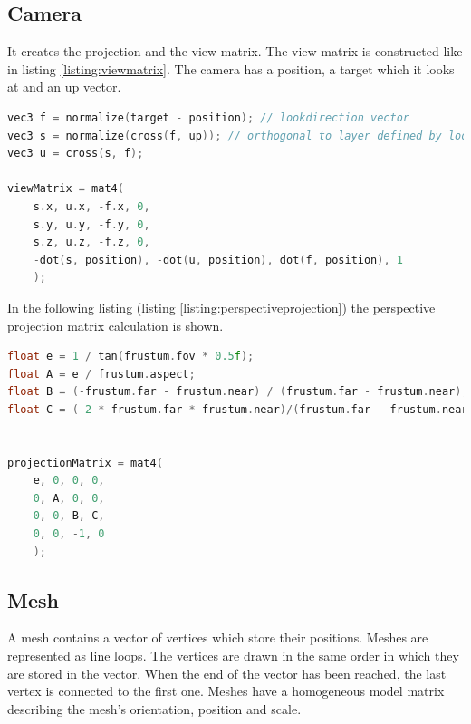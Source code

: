 \documentclass[12pt]{article}
\begin{document}
\subsection{Camera} 

It creates the projection and the view matrix. The view matrix is constructed like in listing \ref{listing:viewmatrix}. The camera has a position, a target which it looks at and an up vector.

\begin{lstlisting}[caption=The View Matrix,label=listing:viewmatrix,language=C++]
vec3 f = normalize(target - position); // lookdirection vector
vec3 s = normalize(cross(f, up)); // orthogonal to layer defined by lookdirection and up
vec3 u = cross(s, f);

viewMatrix = mat4(
	s.x, u.x, -f.x, 0,
	s.y, u.y, -f.y, 0,
	s.z, u.z, -f.z, 0,
	-dot(s, position), -dot(u, position), dot(f, position), 1
	);
\end{lstlisting}

In the following listing (listing \ref{listing:perspectiveprojection}) the perspective projection matrix calculation is shown.

\begin{lstlisting}[caption=The Perspective Projection Matrix, label=listing:perspectiveprojection, language=C++]
float e = 1 / tan(frustum.fov * 0.5f);
float A = e / frustum.aspect;
float B = (-frustum.far - frustum.near) / (frustum.far - frustum.near);
float C = (-2 * frustum.far * frustum.near)/(frustum.far - frustum.near);


projectionMatrix = mat4(
	e, 0, 0, 0,
	0, A, 0, 0,
	0, 0, B, C,
	0, 0, -1, 0
	);
\end{lstlisting}

\subsection{Mesh}

A mesh contains a vector of vertices which store their positions. Meshes are represented as line loops. The vertices are drawn in the same order in which they are stored in the vector. When the end of the vector has been reached, the last vertex is connected to the first one. Meshes have a homogeneous model matrix describing the mesh's orientation, position and scale.

\newpage
\lstlistoflistings
\listoffigures
\end{document}
